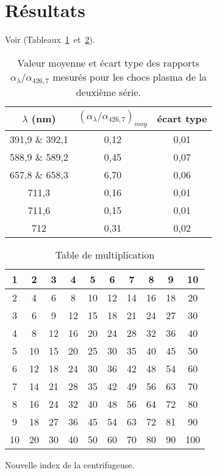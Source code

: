 \section{Résultats}
Voir (Tableaux~\ref{table:alpha}~et~\ref{table:multi}).
\lipsum[3]
\begin{table}[h!tbp]
\begin{center}
\begin{tabular}{|c | c | c |}
\hline
$\lambda$ (nm) & $(\alpha_{\lambda}/\alpha_{426,7})_{moy}$ & écart type \\
\hline
391,9 \& 392,1 & 0,12 & 0,01 \\
588,9 \& 589,2 & 0,45 & 0,07 \\
657,8 \& 658,3 & 6,70 & 0,06 \\
711,3 & 0,16 & 0,01 \\
711,6 & 0,15 & 0,01 \\
712 & 0,31 & 0,02 \\
\hline
\end{tabular}
\end{center}
\caption[Valeur moyenne et écart type des rapports $\alpha_{\lambda}/\alpha_{426,7}$]{Valeur moyenne et écart type des rapports $\alpha_{\lambda}/\alpha_{426,7}$ mesurés pour les chocs plasma de la deuxième série.}
\label{table:alpha}
\end{table}

\lipsum[2]

\begin{table}[h!tbp]
\begin{center}
\begin{tabular}{|*{10}{c|}}
    \hline
     1  & 2  & 3  & 4  & 5  & 6  & 7  & 8  & 9  & 10 \\
    \hline
     2  & 4  & 6  & 8  & 10 & 12 & 14 & 16 & 18 & 20 \\
    \hline
     3  & 6  & 9  & 12 & 15 & 18 & 21 & 24 & 27 & 30 \\
    \hline
     4  & 8  & 12 & 16 & 20 & 24 & 28 & 32 & 36 & 40 \\
    \hline
     5  & 10 & 15 & 20 & 25 & 30 & 35 & 40 & 45 & 50 \\
    \hline
     6  & 12 & 18 & 24 & 30 & 36 & 42 & 48 & 54 & 60 \\
    \hline
     7  & 14 & 21 & 28 & 35 & 42 & 49 & 56 & 63 & 70 \\
    \hline
     8  & 16 & 24 & 32 & 40 & 48 & 56 & 64 & 72 & 80 \\
    \hline
     9  & 18 & 27 & 36 & 45 & 54 & 63 & 72 & 81 & 90 \\
    \hline
     10  & 20  & 30  & 40  & 50  & 60  & 70  & 80  & 90  & 100 \\
    \hline
\end{tabular}
\end{center}
\caption{Table de multiplication}
\label{table:multi}
\end{table}

\lipsum[1]

Nouvelle index de la centrifugeuse.